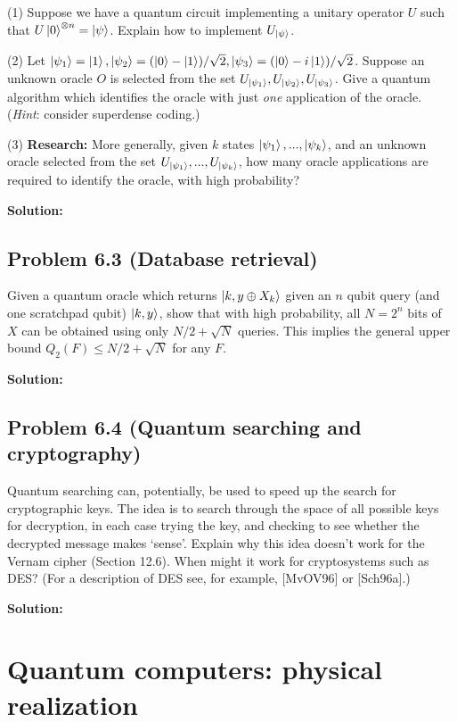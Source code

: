 \documentclass{book}
\begin{document}
        (1) Suppose we have a quantum circuit implementing a unitary operator $U$ such that $U\ket{0}^{\otimes n} = \ket{\psi}$. Explain how to implement $U_{\ket{\psi}}$. \par
        (2) Let $\ket{\psi_1}=\ket{1}, \ket{\psi_2} = (\ket{0}-\ket{1})/\sqrt{2}, \ket{\psi_3}=(\ket{0}-i\ket{1})/\sqrt{2}$. Suppose an unknown oracle $O$ is selected from the set $U_{\ket{\psi_1}}, U_{\ket{\psi_2}}, U_{\ket{\psi_3}}$. Give a quantum algorithm which identifies the oracle with just \emph{one} application of the oracle. (\emph{Hint}: consider superdense coding.) \par
        (3) \textbf{Research:} More generally, given $k$ states $\ket{\psi_1},...,\ket{\psi_k}$, and an unknown oracle selected from the set $U_{\ket{\psi_1}},...,U_{\ket{\psi_k}}$, how many oracle applications are required to identify the oracle, with high probability?
        
        \textbf{Solution:}
    
    \section*{Problem 6.3 (Database retrieval)}
        Given a quantum oracle which returns $\ket{k,y\oplus X_k}$ given an $n$ qubit query (and one scratchpad qubit) $\ket{k,y}$, show that with high probability, all $N=2^n$ bits of $X$ can be obtained using only $N/2 + \sqrt{N}$ queries. This implies the general upper bound $Q_2(F) \leq N/2 +\sqrt{N}$ for any $F$.
        
        \textbf{Solution:}
    
    \section*{Problem 6.4 (Quantum searching and cryptography)}
        Quantum searching can, potentially, be used to speed up the search for cryptographic keys. The idea is to search through the space of all possible keys for decryption, in each case trying the key, and checking to see whether the decrypted message makes ‘sense’. Explain why this idea doesn’t work for the Vernam cipher (Section 12.6). When might it work for cryptosystems such as DES? (For a description of DES see, for example, [MvOV96] or [Sch96a].)
        
        \textbf{Solution:}

\chapter{Quantum computers: physical realization}
\end{document}
